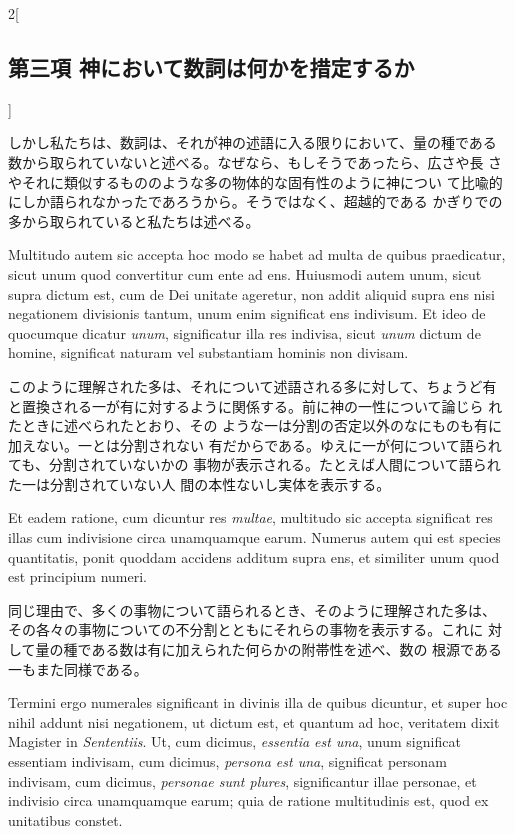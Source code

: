\documentclass[paper=a4paper,fontsize=10pt,jafontsize=9pt,titlepage]{jlreq}
\begin{document}
\begin{paracol}{2}[\subsection{第三項 神において数詞は何かを措定するか}]
\switchcolumn


しかし私たちは、数詞は、それが神の述語に入る限りにおいて、量の種である
 数から取られていないと述べる。なぜなら、もしそうであったら、広さや長
 さやそれに類似するもののような多の物体的な固有性のように神につい
 て比喩的にしか語られなかったであろうから。そうではなく、超越的である
 かぎりでの多から取られていると私たちは述べる。


\switchcolumn*


Multitudo autem sic
accepta hoc modo se habet ad multa de quibus praedicatur, sicut unum
quod convertitur cum ente ad ens. Huiusmodi autem unum, sicut supra
dictum est, cum de Dei unitate ageretur, non addit aliquid supra ens
nisi negationem divisionis tantum, unum enim significat ens
indivisum. Et ideo de quocumque dicatur {\itshape unum}, significatur illa res
indivisa, sicut {\itshape unum} dictum de homine, significat naturam vel
substantiam hominis non divisam.


\switchcolumn


このように理解された多は、それについて述語される多に対して、ちょうど有
 と置換される一が有に対するように関係する。前に神の一性について論じら
 れたときに述べられたとおり、その
 ような一は分割の否定以外のなにものも有に加えない。一とは分割されない
 有だからである。ゆえに一が何について語られても、分割されていないかの
 事物が表示される。たとえば人間について語られた一は分割されていない人
 間の本性ないし実体を表示する。


\switchcolumn*


Et eadem ratione, cum dicuntur res
{\itshape multae}, multitudo sic accepta significat res illas cum indivisione
circa unamquamque earum. Numerus autem qui est species quantitatis,
ponit quoddam accidens additum supra ens, et similiter unum quod est
principium numeri.


\switchcolumn


同じ理由で、多くの事物について語られるとき、そのように理解された多は、
 その各々の事物についての不分割とともにそれらの事物を表示する。これに
 対して量の種である数は有に加えられた何らかの附帯性を述べ、数の
 根源である一もまた同様である。


\switchcolumn*


Termini ergo numerales significant in divinis illa
de quibus dicuntur, et super hoc nihil addunt nisi negationem, ut
dictum est, et quantum ad hoc, veritatem dixit Magister in
{\itshape Sententiis}. Ut, cum dicimus, {\itshape essentia est una}, unum significat
essentiam indivisam, cum dicimus, {\itshape persona est una}, significat personam
indivisam, cum dicimus, {\itshape personae sunt plures}, significantur illae
personae, et indivisio circa unamquamque earum; quia de ratione
multitudinis est, quod ex unitatibus constet.



\end{paracol}
\end{document}
